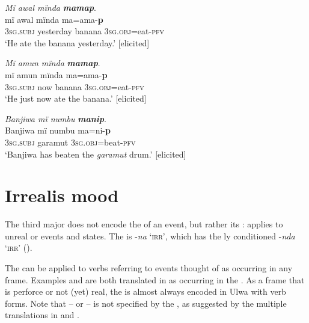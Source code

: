 
\ea%
    \label{ex:verbs:30}
          \textit{Mï awal mïnda} \textbf{\textit{mamap}}.\\
\gll mï      awal    mïnda  ma=ama-\textbf{p}\\
    \textsc{3sg.subj}  yesterday  banana  \textsc{3sg.obj=}eat-\textsc{pfv}\\
\glt `He ate the banana yesterday.’ [elicited] 
\z

\ea%
    \label{ex:verbs:31}
          \textit{Mï amun mïnda} \textbf{\textit{mamap}}.\\
\gll mï      amun  mïnda  ma=ama-\textbf{p}\\
    \textsc{3sg.subj}  now  banana  \textsc{3sg.obj=}eat-\textsc{pfv}\\
\glt `He just now ate the banana.’ [elicited] 
\z

\ea%
    \label{ex:verbs:32}
          \textit{Banjiwa mï numbu} \textbf{\textit{manip}}.\\
\gll Banjiwa  mï      numbu    ma=ni-\textbf{p}\\
    [name]    3\textsc{sg.subj}  garamut  3\textsc{sg.obj}=beat-\textsc{pfv}\\
\glt `Banjiwa has beaten the \textit{garamut} drum.’ [elicited] 
\z

\section{Irrealis mood}\label{sec:4.6}


The third major   does not encode the  of an event, but rather its :   applies to unreal or  events and states. The   is -\textit{na} ‘\textsc{irr}’, which has the ly conditioned  -\textit{nda} ‘\textsc{irr}’ ().

  The   can be applied to verbs referring to events thought of as occurring in any  frame. Examples  and  are both translated in  as occurring in the . As a  frame that is perforce  or not (yet) real, the  is almost always encoded in Ulwa with  verb forms. Note that  --  or  -- is not specified by the  , as suggested by the multiple translations in  and .

